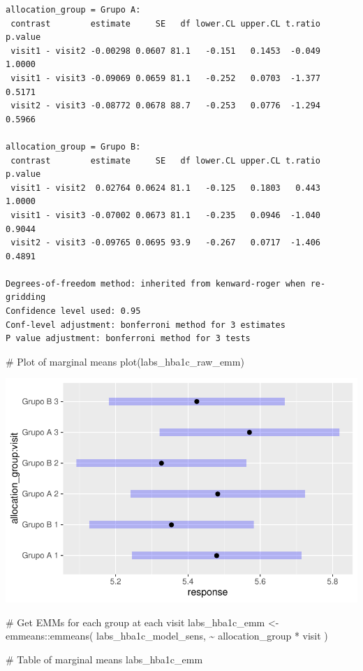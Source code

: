 \documentclass[
  letterpaper,
  DIV=11,
  numbers=noendperiod]{scrartcl}
\newenvironment{Shaded}{\begin{snugshade}}{\end{snugshade}}
\newcommand{\CommentTok}[1]{\textcolor[rgb]{0.37,0.37,0.37}{#1}}
\newcommand{\FunctionTok}[1]{\textcolor[rgb]{0.28,0.35,0.67}{#1}}
\newcommand{\NormalTok}[1]{\textcolor[rgb]{0.00,0.23,0.31}{#1}}
\newcommand{\OtherTok}[1]{\textcolor[rgb]{0.00,0.23,0.31}{#1}}
\newcommand{\SpecialCharTok}[1]{\textcolor[rgb]{0.37,0.37,0.37}{#1}}
\begin{document}
\begin{verbatim}
allocation_group = Grupo A:
 contrast        estimate     SE   df lower.CL upper.CL t.ratio p.value
 visit1 - visit2 -0.00298 0.0607 81.1   -0.151   0.1453  -0.049  1.0000
 visit1 - visit3 -0.09069 0.0659 81.1   -0.252   0.0703  -1.377  0.5171
 visit2 - visit3 -0.08772 0.0678 88.7   -0.253   0.0776  -1.294  0.5966

allocation_group = Grupo B:
 contrast        estimate     SE   df lower.CL upper.CL t.ratio p.value
 visit1 - visit2  0.02764 0.0624 81.1   -0.125   0.1803   0.443  1.0000
 visit1 - visit3 -0.07002 0.0673 81.1   -0.235   0.0946  -1.040  0.9044
 visit2 - visit3 -0.09765 0.0695 93.9   -0.267   0.0717  -1.406  0.4891

Degrees-of-freedom method: inherited from kenward-roger when re-gridding 
Confidence level used: 0.95 
Conf-level adjustment: bonferroni method for 3 estimates 
P value adjustment: bonferroni method for 3 tests 
\end{verbatim}

\begin{Shaded}
\begin{Highlighting}[]
\CommentTok{\# Plot of marginal means}
\FunctionTok{plot}\NormalTok{(labs\_hba1c\_raw\_emm)}
\end{Highlighting}
\end{Shaded}

\includegraphics{Outcomes_V1V2V3_files/figure-pdf/labs_hba1c_raw_emm-1.pdf}

\begin{Shaded}
\begin{Highlighting}[]
\CommentTok{\# Get EMMs for each group at each visit}
\NormalTok{labs\_hba1c\_emm }\OtherTok{\textless{}{-}}\NormalTok{ emmeans}\SpecialCharTok{::}\FunctionTok{emmeans}\NormalTok{(}
\NormalTok{    labs\_hba1c\_model\_sens, }
    \SpecialCharTok{\textasciitilde{}}\NormalTok{ allocation\_group }\SpecialCharTok{*}\NormalTok{ visit}
\NormalTok{)}

\CommentTok{\# Table of marginal means}
\NormalTok{labs\_hba1c\_emm}
\end{Highlighting}
\end{Shaded}
\end{document}
